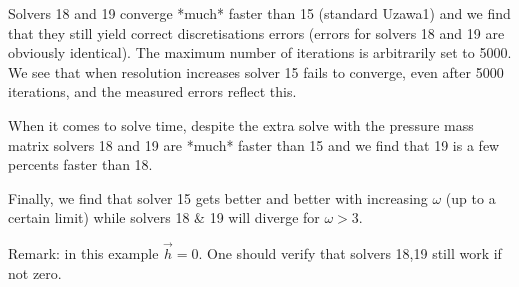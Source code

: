 Solvers 18 and 19 converge *much* faster than 15 (standard Uzawa1) and we find that 
they still yield correct discretisations errors (errors for solvers 18 and 19
are obviously identical).
The maximum number of iterations is arbitrarily set to 5000. We see that when resolution increases 
solver 15 fails to converge, even after 5000 iterations, and the measured errors reflect this.

When it comes to solve time, despite the extra solve with the 
pressure mass matrix solvers 18 and 19 are *much* faster than 15
and we find that 19 is a few percents faster than 18. 

Finally, we find that solver 15 gets better and better with increasing $\omega$
(up to a certain limit) while solvers 18 \& 19 will diverge for $\omega>3$.

Remark: in this example $\vec{h}=0$. One should verify that solvers 18,19 still work if not zero.

